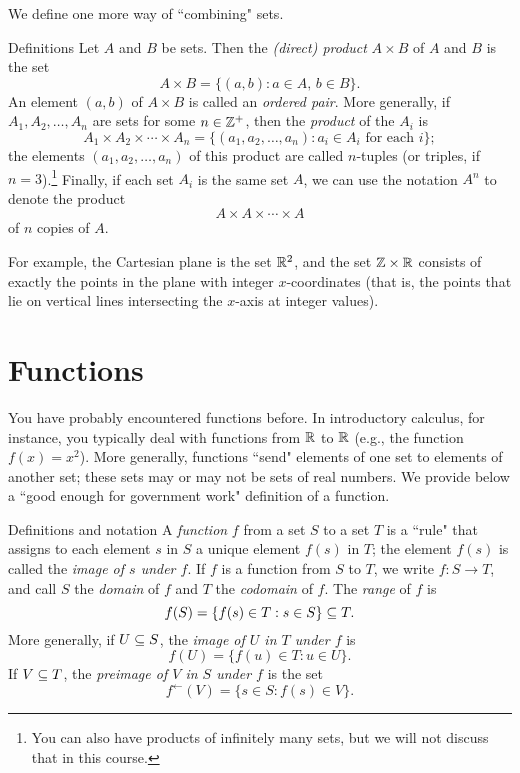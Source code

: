 We define one more way of ``combining" sets.

\begin{df}{Definitions} Let $A$ and $B$ be sets.  Then the \textit{(direct)
product} $A\times B$ of $A$ and $B$ is the set $$A\times B =
\{(a,b): \mbox{$a\in A$, $b\in B$}\}.$$  An element $(a,b)$ of
$A\times B$ is called an \textit{ordered pair}. More generally, if
$A_1, A_2, \ldots, A_n$ are sets for some $n\in \mathbb{Z}^+$, then the
\textit{product} of the $A_i$ is $$A_1\times A_2 \times \cdots
\times A_n=\{(a_1, a_2, \ldots, a_n): a_i \in A_i \mbox{ for
each }i\};$$  the elements $(a_1,a_2,\ldots,a_n)$ of this
product are called $n$-tuples (or triples, if $n=3$).\footnote{
You can also have products of infinitely many sets, but we will
not discuss that in this course.} Finally, if each set $A_i$ is
the same set $A$, we can use the notation $A^n$ to denote the
product $$A\times A \times \cdots \times A$$ of $n$ copies of
$A$.\end{df}

\begin{example}{} For example, the Cartesian plane is the set $\mathbb{R}^2$, and the set $\mathbb{Z} \times \mathbb{R}$ consists of exactly the points in the plane with integer $x$-coordinates
(that is, the points that lie on vertical lines intersecting the $x$-axis at integer values). \end{example}

\section{Functions}

You have probably encountered functions before.  In introductory
calculus, for instance, you typically deal with functions from
$\mathbb{R}$ to $\mathbb{R}$ (e.g., the function $f(x)=x^2$).  More generally,
functions ``send" elements of one set to elements of another set;
these sets may or may not be sets of real numbers. We provide below
a ``good enough for government work" definition of a function.

\begin{df}{Definitions and notation} A \textit{function} $f$ from a set $S$ to a set $T$ is a
``rule" that assigns to each element $s$ in $S$ a unique
element $f(s)$ in $T$; the element $f(s)$ is called the \textit{image of $s$ under $f$}.  If $f$ is a function from $S$ to $T$,
we write $f: S \to T$, and call $S$ the \textit{domain} of $f$ and
$T$ the \textit{codomain} of $f$. The \textit{range} of $f$ is
$$f(S)=\{f(s) \in T : s \in S\} \subseteq T.$$ More generally, if $U \subseteq S$, the \textit{image of $U$ in $T$ under $f$} is
$$f(U)=\{f(u)\in T : u\in U\}.$$ If $V\subseteq T$, the \textit{preimage of $V$ in $S$ under $f$} is the set
$$f^{\leftarrow}(V)=\{s\in S: f(s)\in V\}.$$
\end{df}

